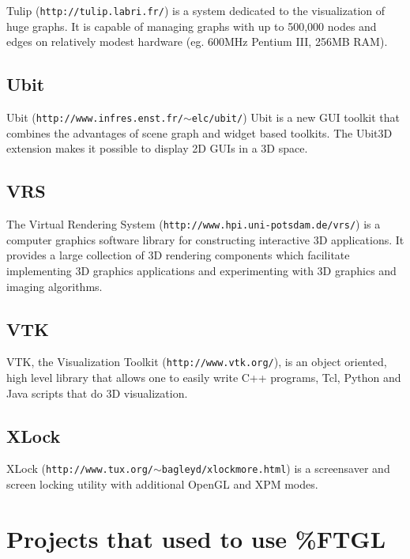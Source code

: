 Tulip ({\tt http://tulip.labri.fr/}) is a system dedicated to the visualization of huge graphs. It is capable of managing graphs with up to 500,000 nodes and edges on relatively modest hardware (eg. 600MHz Pentium III, 256MB RAM).\subsection{Ubit}\label{ftgl-projects_ubit}
Ubit ({\tt http://www.infres.enst.fr/$\sim$elc/ubit/}) Ubit is a new GUI toolkit that combines the advantages of scene graph and widget based toolkits. The Ubit3D extension makes it possible to display 2D GUIs in a 3D space.\subsection{VRS}\label{ftgl-projects_vrs}
The Virtual Rendering System ({\tt http://www.hpi.uni-\/potsdam.de/vrs/}) is a computer graphics software library for constructing interactive 3D applications. It provides a large collection of 3D rendering components which facilitate implementing 3D graphics applications and experimenting with 3D graphics and imaging algorithms.\subsection{VTK}\label{ftgl-projects_vtk}
VTK, the Visualization Toolkit ({\tt http://www.vtk.org/}), is an object oriented, high level library that allows one to easily write C++ programs, Tcl, Python and Java scripts that do 3D visualization.\subsection{XLock}\label{ftgl-projects_xlock}
XLock ({\tt http://www.tux.org/$\sim$bagleyd/xlockmore.html}) is a screensaver and screen locking utility with additional OpenGL and XPM modes.\section{Projects that used to use \%FTGL}\label{ftgl-projects_old}
